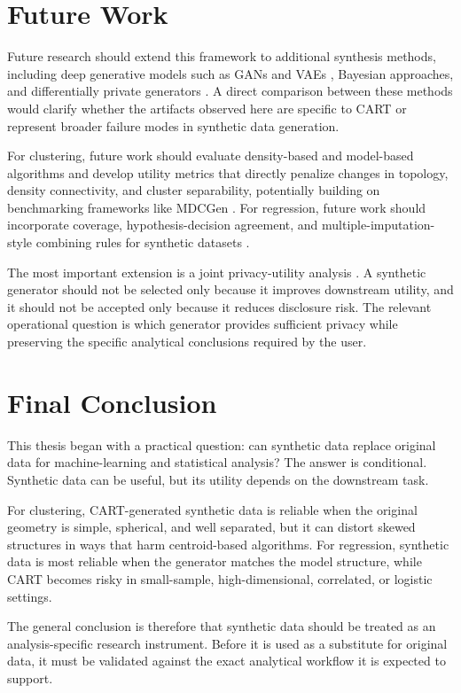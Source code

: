 \section{Future Work}
\label{sec:general-future-work}

Future research should extend this framework to additional synthesis methods, including deep generative models such as GANs and VAEs \cite{jordon2018}, Bayesian approaches, and differentially private generators \cite{dwork2006, bellovin2019}. A direct comparison between these methods would clarify whether the artifacts observed here are specific to CART \cite{nowok2016} or represent broader failure modes in synthetic data generation.

For clustering, future work should evaluate density-based and model-based algorithms and develop utility metrics that directly penalize changes in topology, density connectivity, and cluster separability, potentially building on benchmarking frameworks like MDCGen \cite{iglesias2019}. For regression, future work should incorporate coverage, hypothesis-decision agreement, and multiple-imputation-style combining rules for synthetic datasets \cite{rubin1987, reiter2003}.

The most important extension is a joint privacy-utility analysis \cite{snoke2018, qian2024}. A synthetic generator should not be selected only because it improves downstream utility, and it should not be accepted only because it reduces disclosure risk. The relevant operational question is which generator provides sufficient privacy while preserving the specific analytical conclusions required by the user.

\section{Final Conclusion}
\label{sec:general-final-conclusion}

This thesis began with a practical question: can synthetic data replace original data for machine-learning and statistical analysis? The answer is conditional. Synthetic data can be useful, but its utility depends on the downstream task.

For clustering, CART-generated synthetic data is reliable when the original geometry is simple, spherical, and well separated, but it can distort skewed structures in ways that harm centroid-based algorithms. For regression, synthetic data is most reliable when the generator matches the model structure, while CART becomes risky in small-sample, high-dimensional, correlated, or logistic settings.

The general conclusion is therefore that synthetic data should be treated as an analysis-specific research instrument. Before it is used as a substitute for original data, it must be validated against the exact analytical workflow it is expected to support.
